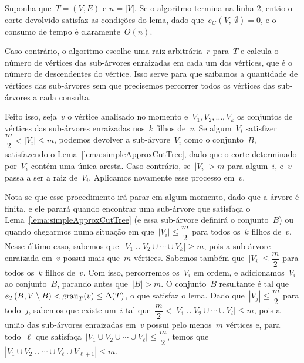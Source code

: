 \bigskip


	Suponha que~$T=(V,E)$ e $n=|V|$.
	Se o algoritmo termina na linha 2, então o corte 
	devolvido satisfaz 
	as condições do lema, dado 
	que~$e_G(V,\ \emptyset) = 0$,
	e o consumo de tempo é claramente~$O(n)$. 

	Caso contrário, o algoritmo escolhe uma raiz arbitrária~$r$ 
	para~$T$ e calcula o número de vértices das sub-árvores 
	enraizadas em cada um dos vértices, que é o número de 
	descendentes do vértice.
	Isso serve para que saibamos a quantidade de vértices das 
	sub-árvores sem que precisemos percorrer todos os vértices das 
	sub-árvores a cada consulta.

	Feito isso, seja~$v$ o vértice analisado no momento 
	e~${V_1, V_2, \ldots, V_k}$ os conjuntos de vértices das
	sub-árvores enraizadas 
	nos~$k$ filhos de~$v$.
	Se algum~$V_i$ satisfizer~${\dfrac{m}{2}<|V_i|\le m}$, podemos 
	devolver a sub-árvore~$V_i$ como o conjunto~$B$, 
	satisfazendo o Lema~\ref{lema:simpleApproxCutTree}, dado que o
	corte determinado por~$V_i$ contém uma única aresta. 
	Caso contrário, se~${|V_i|>m}$ para algum~$i$, 
	e~$v$ passa a ser a raiz de~$V_i$.
	Aplicamos novamente esse processo em~$v$.

	Nota-se que esse procedimento irá parar em algum momento, dado 
	que a árvore é finita, e ele parará quando encontrar uma 
	sub-árvore que satisfaça o Lema~\ref{lema:simpleApproxCutTree}
	(e essa sub-árvore definirá o conjunto~$B$) 
	ou quando chegarmos numa situação em 
	que~${|V_i|\le \dfrac{m}{2}}$ para todos os~$k$ filhos de~$v$.
	Nesse último caso, sabemos 
	que~${|V_1\cup V_2\cup \cdots \cup V_k|\ge m}$, pois
	a sub-árvore enraizada em~$v$ possui mais que~$m$ vértices. 
	Sabemos também que~${|V_i|\le \dfrac{m}{2}}$ para todos os~$k$ 
	filhos de~$v$. 
	Com isso, percorremos os~$V_i$ em ordem, e 
	adicionamos~$V_i$ ao conjunto~$B$, parando antes 
	que~${|B| >m}$. 
	O conjunto~$B$ resultante é tal 
	que~${e_T(B,V\setminus B)<\mathrm{grau}_T(v)\le \Delta(T)}$, 
	o que satisfaz o lema.
	Dado que~${|V_j|\le \dfrac{m}{2}}$ para todo~$j$, sabemos que 
	existe um~$i$ tal 
	que~${\dfrac{m}{2} <|V_1\cup V_2 \cup \cdots \cup V_i|\le m}$, 
	pois a união das sub-árvores enraizadas em~$v$ possui pelo 
	menos~$m$ vértices e, para todo~$\ell$ que 
	satisfaça~${|V_1\cup V_2\cup \cdots\cup V_\ell|\le 
	\dfrac{m}{2}}$, temos 
	que~${|V_1\cup V_2\cup\cdots\cup V_\ell\cup V_{\ell+1}|\le m}$.



